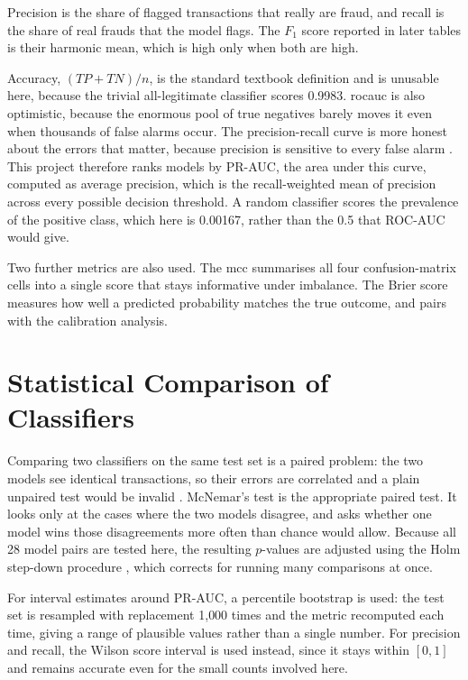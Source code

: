 Precision is the share of flagged transactions that really are fraud, and recall is the
share of real frauds that the model flags. The $F_1$ score reported in later tables is
their harmonic mean, which is high only when both are high.

Accuracy, $(TP+TN)/n$, is the standard textbook definition and is unusable here, because
the trivial all-legitimate classifier
scores 0.9983. \gls{rocauc} is also optimistic, because the enormous pool of true negatives
barely moves it even when thousands of false alarms occur. The precision-recall curve is
more honest about the errors that matter, because precision is sensitive to every false
alarm \citep{davis2006relationship,saito2015precision}. This project therefore ranks models
by PR-AUC, the area under this curve, computed as average precision, which is the
recall-weighted mean of precision across every possible decision threshold. A random
classifier scores the prevalence of the positive class, which here is 0.00167, rather than
the 0.5 that ROC-AUC would give.

Two further metrics are also used. The \gls{mcc} \citep{matthews1975comparison} summarises
all four confusion-matrix cells into a single score that stays informative under imbalance.
The Brier score \citep{brier1950verification} measures how well a predicted probability
matches the true outcome, and pairs with the calibration analysis.

\section{Statistical Comparison of Classifiers}
\label{sec:statmethods}

Comparing two classifiers on the same test set is a paired problem: the two models see
identical transactions, so their errors are correlated and a plain unpaired test would be
invalid \citep{dietterich1998approximate}. McNemar's test \citep{mcnemar1947note} is the
appropriate paired test. It looks only at the cases where the two models disagree, and asks
whether one model wins those disagreements more often than chance would allow. Because all
28 model pairs are tested here, the resulting $p$-values are adjusted
using the Holm step-down procedure \citep{holm1979simple}, which corrects for running many
comparisons at once.

For interval estimates around PR-AUC, a percentile bootstrap \citep{efron1987better} is
used: the test set is resampled with replacement 1{,}000 times and the metric recomputed
each time, giving a range of plausible values rather than a single number. For precision
and recall, the Wilson score interval \citep{wilson1927probable} is used instead, since it
stays within $[0,1]$ and remains accurate even for the small counts involved here.

